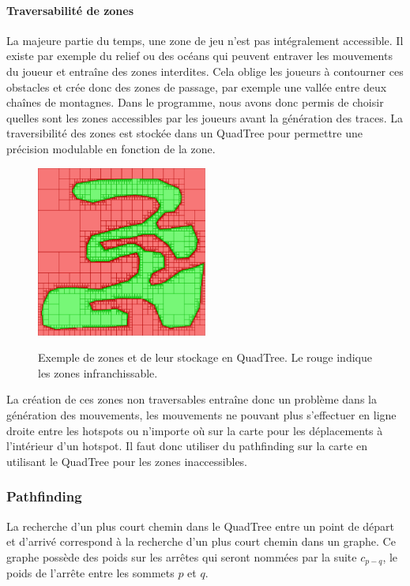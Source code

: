 \paragraph{Traversabilité de zones\\}
La majeure partie du temps, une zone de jeu n'est pas intégralement accessible.
Il existe par exemple du relief ou des océans qui peuvent entraver les mouvements du joueur et entraîne des zones interdites.
Cela oblige les joueurs à contourner ces obstacles et crée donc des zones de passage, par exemple une vallée entre deux chaînes de montagnes.
Dans le programme, nous avons donc permis de choisir quelles sont les zones accessibles par les joueurs avant la génération des traces.
La traversibilité des zones est stockée dans un QuadTree pour permettre une précision modulable en fonction de la zone.

\begin{figure}[h!]
	\centering
	\includegraphics[width=0.5\textwidth]{zones.png}
	\\[0.2cm]
	\caption{Exemple de zones et de leur stockage en QuadTree. Le rouge indique les zones infranchissable.}
	\label{fig:zones}
\end{figure}

La création de ces zones non traversables entraîne donc un problème dans la génération des mouvements, les mouvements ne pouvant plus s'effectuer en ligne droite entre les hotspots ou n'importe où sur la carte pour les déplacements à l'intérieur d'un hotspot.
Il faut donc utiliser du pathfinding sur la carte en utilisant le QuadTree pour les zones inaccessibles.

\subsubsection{Pathfinding}

La recherche d'un plus court chemin dans le QuadTree entre un point de départ et d'arrivé correspond à la recherche d'un plus court chemin dans un graphe.
Ce graphe possède des poids sur les arrêtes qui seront nommées par la suite $c_{p-q}$, le poids de l'arrête entre les sommets $p$ et $q$.

